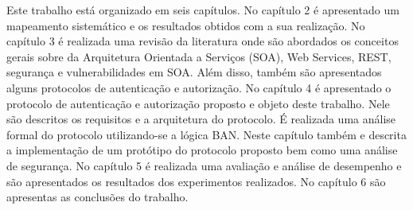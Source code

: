 Este trabalho está organizado em seis capítulos. No capítulo 2 é apresentado um mapeamento sistemático e os resultados obtidos com a sua realização. No capítulo 3 é realizada uma revisão da literatura onde são abordados os conceitos gerais sobre da Arquitetura Orientada a Serviços (SOA), Web Services, REST, segurança e vulnerabilidades em SOA. Além disso, também são apresentados alguns protocolos de autenticação e autorização. No capítulo 4 é apresentado o protocolo de autenticação e autorização proposto e objeto deste trabalho. Nele são descritos os requisitos e a arquitetura do protocolo. É realizada uma análise formal do protocolo utilizando-se a lógica BAN. Neste capítulo também e descrita a implementação de um protótipo do protocolo proposto bem como uma análise de segurança. No capítulo 5 é realizada uma avaliação e análise de desempenho e são apresentados os resultados dos experimentos realizados. No capítulo 6 são apresentas as conclusões do trabalho. 